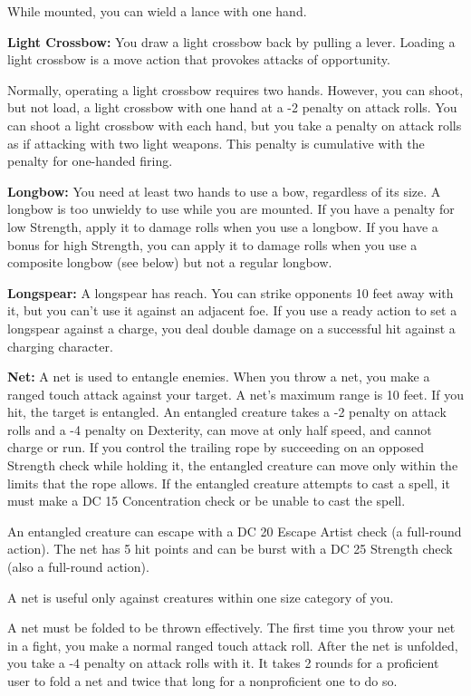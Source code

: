 While mounted, you can wield a lance with one hand.

\textbf{Light Crossbow:} You draw a light crossbow back by pulling a lever. Loading 
a light crossbow is a move action that provokes attacks of opportunity.

Normally, operating a light crossbow requires two hands. However, you can shoot, 
but not load, a light crossbow with one hand at a -2 penalty on attack rolls. You 
can shoot a light crossbow with each hand, but you take a penalty on attack rolls 
as if attacking with two light weapons. This penalty is cumulative with the penalty 
for one-handed firing.

\textbf{Longbow:} You need at least two hands to use a bow, regardless of its size. 
A longbow is too unwieldy to use while you are mounted. If you have a penalty for 
low Strength, apply it to damage rolls when you use a longbow. If you have a bonus 
for high Strength, you can apply it to damage rolls when you use a composite longbow 
(see below) but not a regular longbow.

\textbf{Longspear:} A longspear has reach. You can strike opponents 10 feet away 
with it, but you can't use it against an adjacent foe. If you use a ready action 
to set a longspear against a charge, you deal double damage on a successful hit 
against a charging character.

\textbf{Net:} A net is used to entangle enemies. When you throw a net, you make 
a ranged touch attack against your target. A net's maximum range is 10 feet. If 
you hit, the target is entangled. An entangled creature takes a -2 penalty on attack 
rolls and a -4 penalty on Dexterity, can move at only half speed, and cannot charge 
or run. If you control the trailing rope by succeeding on an opposed Strength check 
while holding it, the entangled creature can move only within the limits that the 
rope allows. If the entangled creature attempts to cast a spell, it must make a 
DC 15 Concentration check or be unable to cast the spell.

An entangled creature can escape with a DC 20 Escape Artist check (a full-round 
action). The net has 5 hit points and can be burst with a DC 25 Strength check 
(also a full-round action).

A net is useful only against creatures within one size category of you.

A net must be folded to be thrown effectively. The first time you throw your net 
in a fight, you make a normal ranged touch attack roll. After the net is unfolded, 
you take a -4 penalty on attack rolls with it. It takes 2 rounds for a proficient 
user to fold a net and twice that long for a nonproficient one to do so.


